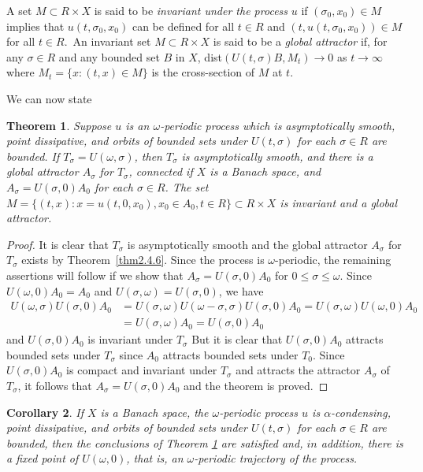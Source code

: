 \documentclass{surv-l}
\theoremstyle{plain}
\newtheorem{theorem}{Theorem}[section]
\newtheorem{corollary}[theorem]{Corollary}
\theoremstyle{definition}
\numberwithin{equation}{section}
\numberwithin{figure}{chapter}
\begin{document}
A set $M\subset R\times X$ is said to be \emph{invariant under the process} $u$ if $(\sigma_{0}, x_{0})\in M$ implies that $u(t, \sigma_{0}, x_{0})$ can be defined for all $t\in R$ and $(t, u(t, \sigma_{0}, x_{0}))\in M$ for all $t\in R$.\ An invariant set $M\subset R\times X$ is said to be a \emph{global attractor} if, for any $\sigma\in R$ and any bounded set $B$ in $X$, dist$(U(t, \sigma)B, M_{t})\rightarrow 0$ as $ t\rightarrow\infty$ where $M_{t}=\{x\!:(t, x)\in M\}$ is the cross-section of $M$ at $t$.

We can now state

\begin{theorem}\label{thm3.6.1} Suppose $u$ is an $\omega$-periodic process which is asymptotically smooth, point dissipative, and orbits of bounded sets under $U(t,\sigma)$ for each $\sigma\in R$ are bounded. If $T_{\sigma}=U(\omega,\sigma)$, then $T_{\sigma}$ is asymptotically smooth, and there is a global attractor $A_{\sigma}$ for $T_{\sigma}$, connected if $X$ is a Banach space, and $A_{\sigma}=U(\sigma,0)A_{0}$ for each $\sigma\in R$. The set $M=\{(t,x)\!:x=u(t,0,x_{0}),x_{0}\in A_{0},t\in R\}\subset R\times X$ is invariant and a global attractor.
\end{theorem}

\begin{proof} It is clear that $T_{\sigma}$ is asymptotically smooth and the global attractor $A_{\sigma}$ for $T_{\sigma}$ exists by Theorem~\ref{thm2.4.6}. Since the process is $\omega$-periodic, the remaining assertions will follow if we show that $A_{\sigma}=U(\sigma,0)A_{0}$ for $ 0\leq\sigma\leq\omega$. Since $U(\omega, 0)A_{0}=A_{0}$ and $U(\sigma,\omega)=U(\sigma, 0)$, we have
\begin{align*}
U(\omega,\sigma)U(\sigma,0)A_{0}&=U(\sigma,\omega)U(\omega-\sigma,\sigma)U(\sigma,0)A_{0}=U(\sigma,\omega)U(\omega,0)A_{0}\\
&=U(\sigma, \omega)A_{0}=U(\sigma, 0)A_{0}
\end{align*}
and $U(\sigma, 0)A_{0}$ is invariant under $T_{\sigma}$ But it is clear that $U(\sigma,0)A_{0}$ attracts bounded sets under $T_{\sigma}$ since $A_{0}$ attracts bounded sets under $T_{0}$. Since $U(\sigma,0)A_{0}$ is compact and invariant under $T_{\sigma}$ and attracts the attractor $A_{\sigma}$ of $T_{\sigma}$, it follows that $A_{\sigma}=U(\sigma,0)A_{0}$ and the theorem is proved.
\end{proof}

\begin{corollary}\label{cor3.6.2} If $X$ is a Banach space, the $\omega$-periodic process $u$ is $\alpha$-condensing, point dissipative, and orbits of bounded sets under $U(t,\sigma)$ for each $\sigma\in R$ are bounded, then the conclusions of Theorem \ref{thm3.6.1} are satisfied and, $in$ addition, there is a fixed point of $U(\omega,0)$, that is, an $\omega$-periodic trajectory of the process.
\end{corollary}
\end{document}
